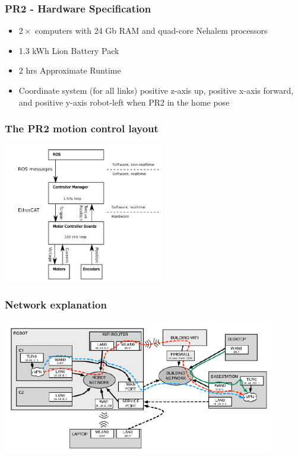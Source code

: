 \begin{frame}
  \frametitle{PR2 - Hardware Specification}
\begin{itemize}
    \item $2\times$ computers with 24 Gb RAM and quad-core Nehalem processors
    \item 1.3 kWh Lion Battery Pack
    \item 2 hrs Approximate Runtime
    \item Coordinate system (for all links) positive z-axis up, positive x-axis forward, and positive y-axis robot-left when PR2 in the home pose
    
\end{itemize}
\end{frame}


\begin{frame}
  \frametitle{The PR2 motion control layout}
\hspace{15ex}\includegraphics[width=7cm]{img/motion_control.png} 
\end{frame}

\begin{frame}
  \frametitle{Network explanation}
\includegraphics[width=12cm]{img/network.png} 
\end{frame}


